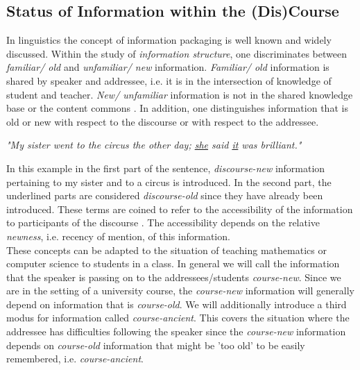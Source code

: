 \documentclass[twoside, 12pt]{article}
\begin{document}
\subsection{Status of Information within the (Dis)Course}
\label{sec:infostatus}

In linguistics the concept of information packaging \cite{CambridgeGrammar:npentrel14} is well known and widely discussed. Within the study of \textit{information structure}, one discriminates between \textit{familiar/ old} and \textit{unfamiliar/ new} information. \textit{Familiar/ old} information is shared by speaker and addressee, i.e. it is in the intersection of knowledge of student and teacher. \textit{New/ unfamiliar} information is not in the shared knowledge base or the content commons \cite{CNX:whitepaper}. In addition, one distinguishes information that is old or new with respect to the discourse or with respect to the addressee.

\begin{center}
\textit{"My sister went to the circus the other day; \underline{she} said \underline{it} was brilliant."}\\
\end{center}

In this example in the first part of the sentence, \textit{discourse-new} information pertaining to my sister and to a circus is introduced. In the second part, the underlined parts are considered \textit{discourse-old} since they have already been introduced. These terms are coined to refer to the accessibility of the information to participants of the discourse \cite{Newness:npentrel14}. The accessibility depends on the relative \textit{newness}, i.e. recency of mention, of this information.\\

These concepts can be adapted to the situation of teaching mathematics or computer science to students in a class. In general we will call the information that the speaker is passing on to the addressees/students \textit{course-new}. Since we are in the setting of a university course, the \textit{course-new} information will generally depend on information that is \textit{course-old}. We will additionally introduce a third modus for information called \textit{course-ancient}. This covers the situation where the addressee has difficulties following the speaker since the \textit{course-new} information depends on \textit{course-old} information that might be 'too old' to be easily remembered, i.e. \textit{course-ancient}.\\
\end{document}
